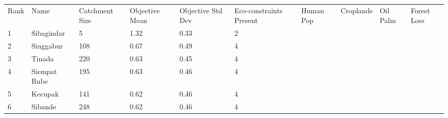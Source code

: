 \begin{table}[ht]
\centering
\begingroup\fontsize{8pt}{9pt}\selectfont
\begin{tabular}{C{0.03\textwidth}C{0.12\textwidth}C{0.09\textwidth}C{0.08\textwidth}C{0.08\textwidth}C{0.08\textwidth}C{0.07\textwidth}C{0.07\textwidth}C{0.07\textwidth}C{0.07\textwidth}}
 Rank & Name & Catchment Size & Objective Mean & Objective Std Dev & Eco-constraints  Present & Human Pop & Croplands & Oil Palm & Forest Loss \\ 
 {1} & Sibagindar &   5 & \textcolor[HTML]{FFFFFF}{1.32} & \textcolor[HTML]{000000}{0.33} & \textcolor[HTML]{000000}{2} &  &  &  &  \\ 
  {2} & Singgabur & 108 & \textcolor[HTML]{000000}{0.67} & \textcolor[HTML]{FFFFFF}{0.49} & \textcolor[HTML]{FFFFFF}{4} &  &  &  &  \\ 
  {3} & Tinada & 220 & \textcolor[HTML]{000000}{0.63} & \textcolor[HTML]{FFFFFF}{0.45} & \textcolor[HTML]{FFFFFF}{4} &  &  &  &  \\ 
  {4} & Siempat Rube & 195 & \textcolor[HTML]{000000}{0.63} & \textcolor[HTML]{FFFFFF}{0.46} & \textcolor[HTML]{FFFFFF}{4} &  &  &  &  \\ 
  {5} & Kecupak & 141 & \textcolor[HTML]{000000}{0.62} & \textcolor[HTML]{FFFFFF}{0.46} & \textcolor[HTML]{FFFFFF}{4} &  &  &  &  \\ 
  {6} & Sibande & 248 & \textcolor[HTML]{000000}{0.62} & \textcolor[HTML]{FFFFFF}{0.46} & \textcolor[HTML]{FFFFFF}{4} &  &  &  &  \\ 

\end{tabular}
\end{table}
